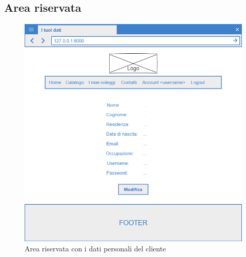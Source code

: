 \documentclass[12pt,a4paperS]{report}
\begin{document}
\begin{normalsize}
			\subsection{Area riservata}
				\begin{figure}[H]
					\centering
					\includegraphics[width=1\textwidth, height=1\textheight, keepaspectratio]{Mockup/Area_riservata.png}
					\caption{Area riservata con i dati personali del cliente}
				\end{figure}
			

\end{normalsize}
\end{document}
